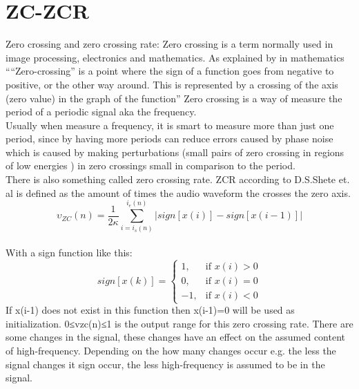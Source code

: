 \section{ZC-ZCR}
Zero crossing and zero crossing rate:
Zero crossing is a term normally used in image processing, electronics and mathematics. As explained by \cite{Al-Zhrani2010} in mathematics ““Zero-crossing” is a point where the sign of a function goes from negative to positive, or the other way around. This is represented by a crossing of the axis (zero value) in the graph of the function” \cite{Al-Zhrani2010}
Zero crossing is a way of measure the period of a periodic signal aka the frequency.\cite{RWW2012} \\
Usually when measure a frequency, it is smart to measure more than just one period, since by having more periods can reduce errors caused by phase noise which is caused by making perturbations (small pairs of zero crossing in regions of low energies \cite{Mallat1988} ) in zero crossings small in comparison to the period. \cite{RWW2012} \\
There is also something called zero crossing rate. ZCR according to D.S.Shete et. al is defined as the amount of times the audio waveform the crosses the zero axis.\\
\begin{equation}\label{eq:ZCR}
\upsilon_{ZC}(n)= \frac{1}{2 \kappa}\sum_{i=i_s(n)}^{i_e (n)}|sign[x(i)]-sign[x(i-1)]|
\end{equation}
\\
With a sign function like this:
\begin{equation}
sign[x(k)]=
\begin{cases}
 1, & \text{if } x(i)>0\\ 
 0, & \text{if } x(i)=0\\
-1, & \text{if } x(i)<0
\end{cases}
\end{equation}
If x(i-1) does not exist in this function then x(i-1)=0 will be used as initialization. 
0≤vzc(n)≤1 is the output range for this zero crossing rate. There are some changes in the signal, these changes have an effect on the assumed content of high-frequency. Depending on the how many changes occur e.g. the less the signal changes it sign occur, the less high-frequency is assumed to be in the signal. \citep{AlZhrani2010} 